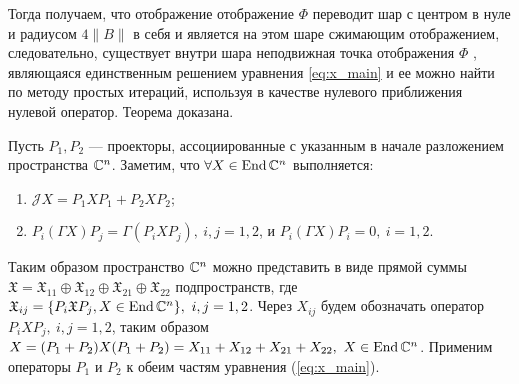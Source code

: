 Тогда получаем, что отображение отображение $\Phi$ переводит шар с центром в нуле и радиусом $4\|B\|$ в себя и является на этом шаре сжимающим отображением, следовательно, существует внутри шара неподвижная точка отображения $\Phi$ , являющаяся единственным решением уравнения \eqref{eq:x_main} и ее можно найти по методу простых итераций, используя в качестве нулевого приближения нулевой оператор. Теорема доказана.
\hfill

Пусть $P_1,P_2$ --- проекторы, ассоциированные с указанным в начале разложением пространства $\mathbb{C}^n$. Заметим, что $\forall X \in \operatorname{End}\mathbb{C}^n$ выполняется:
\begin{enumerate}
	\item $\mathcal{J}X = P_1 X P_1 + P_2 X P_2;$
	\item $P_i(\Gamma X)P_j = \Gamma(P_i X P_j),\ i,j = 1,2$, и $P_i(\Gamma X)P_i = 0,\ i = 1,2$.
\end{enumerate}
Таким образом пространство $\mathbb{C}^n$ можно представить в виде прямой суммы $\mathfrak{X} = \mathfrak{X}_{11} \oplus \mathfrak{X}_{12} \oplus \mathfrak{X}_{21} \oplus \mathfrak{X}_{22}$ подпространств, где $\mathfrak{X}_{ij} = \{ P_i \mathfrak{X} P_j, X \in \operatorname{End}\mathbb{C}^n \},\\ \ i,j = 1,2$.
Через $X_{ij}$ будем обозначать оператор $P_i X P_j,\ i,j=1,2$, таким образом $X = (P_1 + P_2)X(P_1 + P_2) = X_{11} + X_{12} + X_{21} + X_{22},\ X \in \operatorname{End}\mathbb{C}^n$.
Применим операторы $P_1 \text{ и } P_2$ к обеим частям уравнения (\ref{eq:x_main}).
